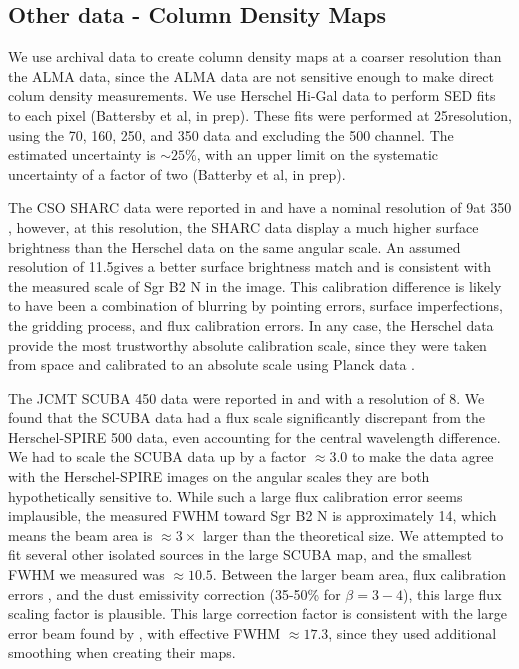 \documentclass[twocolumn]{aastex61}
\newcommand{\percent}{\%\xspace}
\begin{document}
\subsection{Other data - Column Density Maps}
\label{sec:colmaps}
We use archival data to create column density maps at a coarser
resolution than the ALMA data, since the ALMA data are not sensitive
enough to make direct colum density measurements.   We use Herschel Hi-Gal
data \citep{Molinari2010a} to perform SED fits to each pixel (Battersby et al,
in prep).  These fits were performed at 25\arcsec resolution, using the 70, 160,
250, and 350 \um data and excluding the 500 \um channel.  The estimated 
uncertainty is $\sim25\%$, with an upper limit on the systematic uncertainty
of a factor of two (Batterby et al, in prep).


The CSO SHARC data were reported in \citet{Bally2010a} and have a nominal
resolution of 9\arcsec at 350 \um, however, at this resolution,
the SHARC data display a much higher surface brightness than the Herschel
data on the same angular scale.  An assumed resolution of 11.5\arcsec gives a
better surface brightness match and is consistent with the measured scale of
Sgr B2 N in the image.  This calibration difference is likely to have been a
combination of blurring by pointing errors, surface imperfections, the
gridding process, and flux calibration errors.  In any case, the Herschel data
provide the most trustworthy absolute calibration scale, since they were taken
from space and calibrated to an absolute scale using Planck data
\citep{Bendo2013a,Bertincourt2015a}.

The JCMT SCUBA 450 \um data were reported in \citet{Pierce-Price2000a} and
\citet{di-Francesco2008a} with a resolution of 8\arcsec.  We found that the
SCUBA data had a flux scale significantly discrepant from the Herschel-SPIRE
500 \um data, even accounting for the central wavelength difference.  We had to
scale the SCUBA data up by a factor $\approx3.0$ to make the data agree with
the Herschel-SPIRE images on the angular scales they are both hypothetically
sensitive to.  While such a large flux calibration error seems implausible, the
measured FWHM toward Sgr B2 N is approximately 14\arcsec, which means the beam
area is $\approx3\times$ larger than the theoretical size.  We attempted to fit
several other isolated sources in the large SCUBA map, and the smallest FWHM we
measured was $\approx10.5$\arcsec.  Between the larger beam area, flux
calibration errors \citep[quoted at 20\percent in][]{Pierce-Price2000a}, and
the dust emissivity correction (35-50\percent for $\beta=3-4$), this large flux
scaling factor is plausible. This large correction factor is consistent with
the large error beam found by \citet{di-Francesco2008a}, with effective FWHM
$\approx17.3$\arcsec, since they used additional smoothing when creating their
maps.
\end{document}
